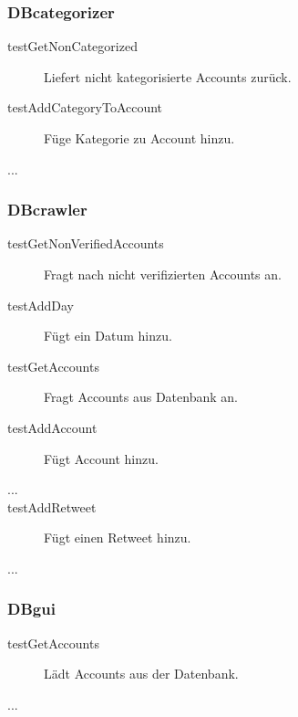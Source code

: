 \subsubsection{DBcategorizer}
\quad
\begin{description}
	\item[testGetNonCategorized] Liefert nicht kategorisierte Accounts zurück.
	\item[testAddCategoryToAccount] Füge Kategorie zu Account hinzu.
	\item[...]
\end{description}
\subsubsection{DBcrawler}
\begin{description}
	\item[testGetNonVerifiedAccounts] Fragt nach nicht verifizierten Accounts an.
	\item[testAddDay] Fügt ein Datum hinzu.
	\item[testGetAccounts] Fragt Accounts aus Datenbank an.
	\item[testAddAccount] Fügt Account hinzu.
	\item[...]
	\item[testAddRetweet] Fügt einen Retweet hinzu.
	\item[...]	
\end{description}
\subsubsection{DBgui}
\begin{description}
	\item [testGetAccounts] Lädt Accounts aus der Datenbank.
	\item [...]
\end{description}
\quad



